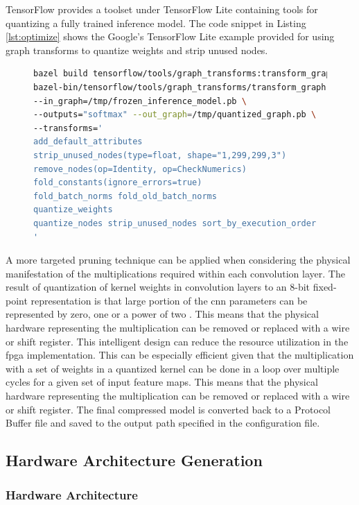 \documentclass{uw-ece-wkrpt}
\begin{document}
TensorFlow provides a toolset under TensorFlow Lite containing tools for quantizing a fully trained inference model. The code snippet in Listing \ref{lst:optimize} shows the Google's TensorFlow Lite example provided for using graph transforms to quantize weights and strip unused nodes.

\begin{figure}
\centering
\begin{lstlisting}[caption={Code snippet to optimize a trained inference model}, label=lst:optimize, language=bash]
bazel build tensorflow/tools/graph_transforms:transform_graph
bazel-bin/tensorflow/tools/graph_transforms/transform_graph \
--in_graph=/tmp/frozen_inference_model.pb \
--outputs="softmax" --out_graph=/tmp/quantized_graph.pb \
--transforms='
add_default_attributes
strip_unused_nodes(type=float, shape="1,299,299,3")
remove_nodes(op=Identity, op=CheckNumerics)
fold_constants(ignore_errors=true)
fold_batch_norms fold_old_batch_norms
quantize_weights
quantize_nodes strip_unused_nodes sort_by_execution_order
'
\end{lstlisting}
\end{figure}

A more targeted pruning technique can be applied when considering the physical manifestation of the multiplications required within each convolution layer. The result of quantization of \gls{kernel} weights in convolution layers to an 8-bit fixed-point representation is that large portion of the \gls{cnn} parameters can be represented by zero, one or a power of two \cite{Abdelouahab2017Hardware-Automa}. This means that the physical hardware representing the multiplication can be removed or replaced with a wire or shift register. This intelligent design can reduce the resource utilization in the \gls{fpga} implementation. This can be especially efficient given that the multiplication with a set of weights in a quantized \gls{kernel} can be done in a loop over multiple cycles for a given set of input feature maps. This means that the physical hardware representing the multiplication can be removed or replaced with a wire or shift register. The final compressed model is converted back to a Protocol Buffer file and saved to the output path specified in the configuration file.

\subsection{Hardware Architecture Generation}

\subsubsection{Hardware Architecture}
\end{document}
